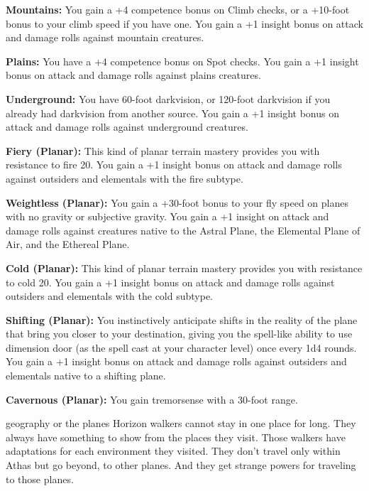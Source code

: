 {\textbf{Mountains:} You gain a +4 competence bonus on Climb checks, or a +10-foot bonus to your climb speed if you have one. You gain a +1 insight bonus on attack and damage rolls against mountain creatures.

\textbf{Plains:} You have a +4 competence bonus on Spot checks. You gain a +1 insight bonus on attack and damage rolls against plains creatures.

\textbf{Underground:} You have 60-foot darkvision, or 120-foot darkvision if you already had darkvision from another source. You gain a +1 insight bonus on attack and damage rolls against underground creatures.

\textbf{Fiery (Planar):} This kind of planar terrain mastery provides you with resistance to fire 20. You gain a +1 insight bonus on attack and damage rolls against outsiders and elementals with the fire subtype.

\textbf{Weightless (Planar):} You gain a +30-foot bonus to your fly speed on planes with no gravity or subjective gravity. You gain a +1 insight on attack and damage rolls against creatures native to the Astral Plane, the Elemental Plane of Air, and the Ethereal Plane.

\textbf{Cold (Planar):} This kind of planar terrain mastery provides you with resistance to cold 20. You gain a +1 insight bonus on attack and damage rolls against outsiders and elementals with the cold subtype.

\textbf{Shifting (Planar):} You instinctively anticipate shifts in the reality of the plane that bring you closer to your destination, giving you the spell-like ability to use dimension door (as the spell cast at your character level) once every 1d4 rounds. You gain a +1 insight bonus on attack and damage rolls against outsiders and elementals native to a shifting plane.

\textbf{Cavernous (Planar):} You gain tremorsense with a 30-foot range.
}
{}
{geography or the planes}
{Horizon walkers cannot stay in one place for long. They always have something to show from the places they visit.}
{Those walkers have adaptations for each environment they visited.}
{They don't travel only within Athas but go beyond, to other planes. And they get strange powers for traveling to those planes.}